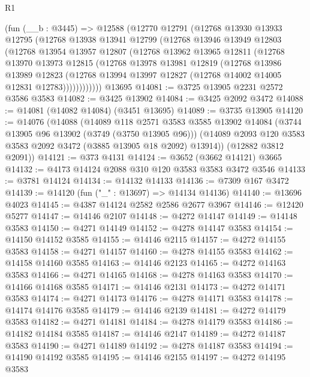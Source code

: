 \begin{lexlean}{R1}
\begin{coremodule}
    (fun (__b : @3445) =>
    @12588
      (@12770
        @12791
        (@12768
          @13930
          @13933
          @12795
          (@12768
            @13938
            @13941
            @12799
            (@12768
              @13946
              @13949
              @12803
              (@12768
                @13954
                @13957
                @12807
                (@12768
                  @13962
                  @13965
                  @12811
                  (@12768
                    @13970
                    @13973
                    @12815
                    (@12768
                      @13978
                      @13981
                      @12819
                      (@12768
                        @13986
                        @13989
                        @12823
                        (@12768 @13994 @13997 @12827 (@12768 @14002 @14005 @12831 @12783))))))))))))
    @13695
@14081 := @3725 @13905 @2231 @2572 @3586 @3583
@14082 := @3425 @13902
@14084 := @3425 @2092 @3472
@14088 := @14081 (@14082 @14084) (@3451 @13695)
@14089 := @3735 @13905
@14120 := @14076
    (@14088
      (@14089
        @118
        @2571
        @3583
        @3585
        @13902
        @14084
        (@3744 @13905 @96 @13902 (@3749 (@3750 @13905 @96)))
        (@14089 @2093 @120 @3583 @3583 @2092 @3472 (@3885 @13905 @18 @2092) @13914))
      (@12882 @3812 @2091))
@14121 := @373 @4131
@14124 := @3652 (@3662 @14121) @3665
@14132 := @4173 @14124 @2088 @310 @120 @3583 @3583 @3472 @3546
@14133 := @3781 @14124
@14134 := @14132 @14133
@14136 := @7309 @167 @3472
@14139 := @14120 (fun ("_" : @13697) => @14134 @14136)
@14140 := @13696 @4023
@14145 := @4387 @14124 @2582 @2586 @2677 @3967
@14146 := @12420 @5277
@14147 := @14146 @2107
@14148 := @4272 @14147
@14149 := @14148 @3583
@14150 := @4271 @14149
@14152 := @4278 @14147 @3583
@14154 := @14150 @14152 @3585
@14155 := @14146 @2115
@14157 := @4272 @14155 @3583
@14158 := @4271 @14157
@14160 := @4278 @14155 @3583
@14162 := @14158 @14160 @3585
@14163 := @14146 @2123
@14165 := @4272 @14163 @3583
@14166 := @4271 @14165
@14168 := @4278 @14163 @3583
@14170 := @14166 @14168 @3585
@14171 := @14146 @2131
@14173 := @4272 @14171 @3583
@14174 := @4271 @14173
@14176 := @4278 @14171 @3583
@14178 := @14174 @14176 @3585
@14179 := @14146 @2139
@14181 := @4272 @14179 @3583
@14182 := @4271 @14181
@14184 := @4278 @14179 @3583
@14186 := @14182 @14184 @3585
@14187 := @14146 @2147
@14189 := @4272 @14187 @3583
@14190 := @4271 @14189
@14192 := @4278 @14187 @3583
@14194 := @14190 @14192 @3585
@14195 := @14146 @2155
@14197 := @4272 @14195 @3583

\end{coremodule}
\end{lexlean}

